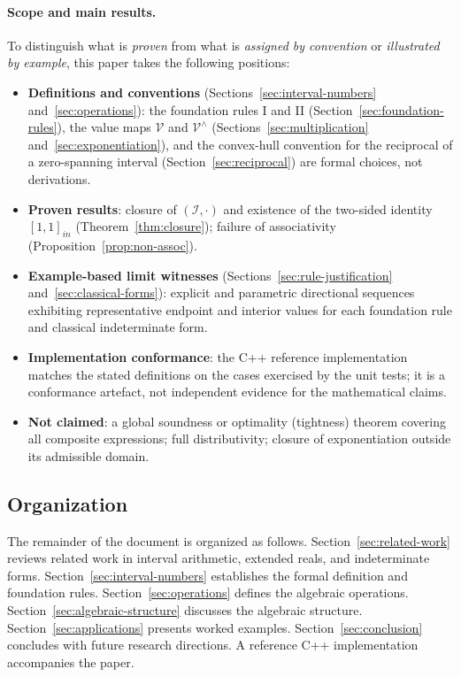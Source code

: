 \documentclass[11pt,a4paper]{article}
\theoremstyle{paperdef}
\newcommand{\Iset}{\mathcal{I}}
\newcommand{\inI}[1]{[#1]_{in}}
\newcommand{\V}{\mathcal{V}}
\newcommand{\Vhat}{\mathcal{V}^{\wedge}}
\begin{document}
\paragraph{Scope and main results.} To distinguish what is
\emph{proven} from what is \emph{assigned by convention} or
\emph{illustrated by example}, this paper takes the following
positions:
\begin{itemize}[leftmargin=2em]
  \item \textbf{Definitions and conventions}
    (Sections~\ref{sec:interval-numbers} and~\ref{sec:operations}):
    the foundation rules I and II
    (Section~\ref{sec:foundation-rules}), the value maps $\V$ and
    $\Vhat$ (Sections~\ref{sec:multiplication}
    and~\ref{sec:exponentiation}), and the convex-hull convention for
    the reciprocal of a zero-spanning interval
    (Section~\ref{sec:reciprocal}) are formal choices, not
    derivations.
  \item \textbf{Proven results}: closure of $(\Iset, \cdot)$ and
    existence of the two-sided identity $\inI{1,1}$
    (Theorem~\ref{thm:closure}); failure of associativity
    (Proposition~\ref{prop:non-assoc}).
  \item \textbf{Example-based limit witnesses}
    (Sections~\ref{sec:rule-justification}
    and~\ref{sec:classical-forms}): explicit and parametric directional
    sequences exhibiting representative endpoint and interior values
    for each foundation rule and classical indeterminate form.
  \item \textbf{Implementation conformance}: the C++ reference
    implementation matches the stated definitions on the cases
    exercised by the unit tests; it is a conformance artefact, not
    independent evidence for the mathematical claims.
  \item \textbf{Not claimed}: a global soundness or optimality
    (tightness) theorem covering all composite expressions; full
    distributivity; closure of exponentiation outside its admissible
    domain.
\end{itemize}

\subsection{Organization}

The remainder of the document is organized as follows.
Section~\ref{sec:related-work} reviews related work in interval
arithmetic, extended reals, and indeterminate forms.
Section~\ref{sec:interval-numbers} establishes the formal definition
and foundation rules. Section~\ref{sec:operations} defines the
algebraic operations. Section~\ref{sec:algebraic-structure} discusses
the algebraic structure. Section~\ref{sec:applications} presents
worked examples. Section~\ref{sec:conclusion} concludes with future
research directions. A reference C++ implementation accompanies the
paper.
\end{document}
